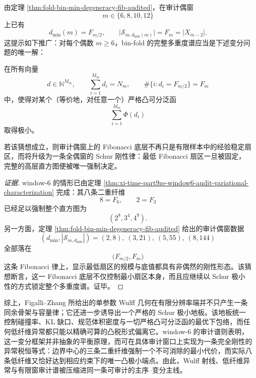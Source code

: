 \begin{conjecture}\label{conj:xi-time-part9ze-even-window-fibonacci-schur-rigidity}
由定理 \ref{thm:fold-bin-min-degeneracy-fib-audited}，在审计偶窗
\[
m\in\{6,8,10,12\}
\]
上已有
\[
d_{\min}(m)=F_{m/2},
\qquad
\bigl|\mathcal S_{m,d_{\min}(m)}\bigr|=F_m=|X_{m-2}|.
\]
这提示如下推广：对每个偶数 \(m\ge 6\)，bin-fold 的完整多重度谱应当是下述变分问题的唯一解：

在所有向量
\[
d\in \mathbb N^{M_m},
\qquad
\sum_{i=1}^{M_m}d_i=N_m,
\qquad
\#\{i:d_i=F_{m/2}\}=F_m
\]
中，使得对某个（等价地，对任意一个）严格凸可分泛函
\[
\sum_{i=1}^{M_m}\Phi(d_i)
\]
取得极小。

若该猜想成立，则审计偶窗上的 Fibonacci 底层不再只是有限样本中的经验稳定扇区，而将升级为一条全偶窗的 Schur 刚性律：最低 Fibonacci 扇区一旦被固定，完整的高层直方图便被唯一强制决定。
\end{conjecture}
\begin{proof}[证据]
window-\(6\) 的情形已由定理 \ref{thm:xi-time-part9ze-window6-audit-variational-characterization} 完成：其八条二重纤维
\[
8=F_6,\qquad 2=F_3
\]
已经足以强制整个直方图为
\[
(2^8,3^4,4^9).
\]
另一方面，定理 \ref{thm:fold-bin-min-degeneracy-fib-audited} 给出的审计偶窗数据
\[
(d_{\min},|\mathcal S_{m,d_{\min}}|)
=(2,8),\ (3,21),\ (5,55),\ (8,144)
\]
全部落在
\[
\bigl(F_{m/2},F_m\bigr)
\]
这条 Fibonacci 律上，显示最低扇区的规模与底值都具有非偶然的刚性形态。该猜想断言，这一 Fibonacci 底层不仅控制最小扇区本身，而且应继续以 Schur 极小性的方式锁定整个多重度谱。证毕。
\end{proof}

\noindent
综上，Figalli--Zhang 所给出的单参数 Wulff 几何在有限分辨率端并不只产生一条同余骨架与容量律；它还进一步诱导出一个严格的 Schur 极小地板。该地板统一控制碰撞率、KL 缺口、规范体积密度与一切严格凸可分泛函的最优下包络，而任何低纤维异常都只能以精确可算的凸税形式偏离它。window-\(6\) 的审计谱则表明，这一变分框架并非抽象的平衡原理，而可在具体审计窗口上实现为一条完全刚性的异常税恒等式：边界中心的三条二重纤维强制一个不可消除的最小代价，而实际八条低纤维又恰好达到相应约束下的唯一凸极小端点。由此，Wulff 射线、低纤维异常与有限窗审计谱被压缩进同一条可审计的主序--变分主线。

\endinput
